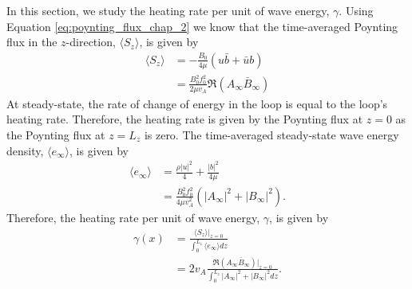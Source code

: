 In this section, we study the heating rate per unit of wave energy, $\gamma$. Using Equation \eqref{eq:poynting_flux_chap_2} we know that the time-averaged Poynting flux in the $z$-direction, $\langle S_z \rangle$, is given by
\begin{equation}
    \begin{aligned}
    \langle S_z \rangle &= -\frac{B_0}{4\mu}(u\bar{b} + \bar{u}b) \\
    &= \frac{B_0^2f_0^2}{2\mu v_A}\Re(A_\infty\bar{B}_\infty)
    \end{aligned}
\end{equation}
At steady-state, the rate of change of energy in the loop is equal to the loop's heating rate. Therefore, the heating rate is given by the Poynting flux at $z=0$ as the Poynting flux at $z=L_z$ is zero. The time-averaged steady-state wave energy density, $\langle e_\infty \rangle$, is given by
\begin{equation}
    \begin{aligned}
    \langle e_\infty \rangle &= \frac{\rho |u|^2}{4} + \frac{|b|^2}{4\mu} \\
    &= \frac{B_0^2f_0^2}{4\mu v_A^2}(|A_\infty|^2 + |B_\infty|^2).
    \end{aligned}
\end{equation}
Therefore, the heating rate per unit of wave energy, $\gamma$, is given by
\begin{equation}
    \label{eq:gamma_exact_closed_loop}
    \begin{aligned}
    \gamma(x) &= \frac{\langle S_z \rangle|_{z=0}}{\int_{0}^{L_z}\langle e_\infty \rangle dz} \\
    &=2v_A\frac{\Re(A_\infty \bar{B}_\infty)|_{z=0}}{\int_{0}^{L_z}|A_\infty|^2 + |B_\infty|^2dz}.
    \end{aligned}
\end{equation}

